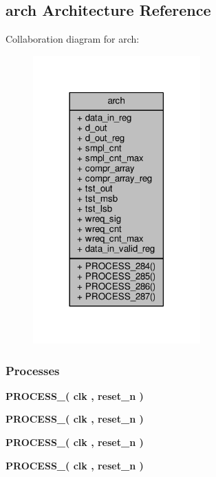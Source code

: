 \subsection{arch Architecture Reference}
\label{classcompress__v2_1_1arch}


Collaboration diagram for arch\+:\nopagebreak
\begin{figure}[H]
\begin{center}
\leavevmode
\includegraphics[width=182pt]{d2/d1f/classcompress__v2_1_1arch__coll__graph}
\end{center}
\end{figure}
\subsubsection*{Processes}
 \begin{DoxyCompactItemize}
\item 
{\bf P\+R\+O\+C\+E\+S\+S\+\_}{\bfseries  ( {\bfseries {\bfseries {\bf clk}} \textcolor{vhdlchar}{ }} , {\bfseries {\bfseries {\bf reset\+\_\+n}} \textcolor{vhdlchar}{ }} )}
\item 
{\bf P\+R\+O\+C\+E\+S\+S\+\_}{\bfseries  ( {\bfseries {\bfseries {\bf clk}} \textcolor{vhdlchar}{ }} , {\bfseries {\bfseries {\bf reset\+\_\+n}} \textcolor{vhdlchar}{ }} )}
\item 
{\bf P\+R\+O\+C\+E\+S\+S\+\_}{\bfseries  ( {\bfseries {\bfseries {\bf clk}} \textcolor{vhdlchar}{ }} , {\bfseries {\bfseries {\bf reset\+\_\+n}} \textcolor{vhdlchar}{ }} )}
\item 
{\bf P\+R\+O\+C\+E\+S\+S\+\_}{\bfseries  ( {\bfseries {\bfseries {\bf clk}} \textcolor{vhdlchar}{ }} , {\bfseries {\bfseries {\bf reset\+\_\+n}} \textcolor{vhdlchar}{ }} )}
\end{DoxyCompactItemize}
